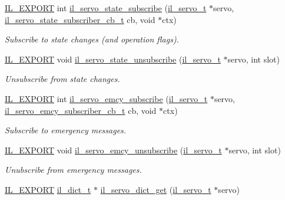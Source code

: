 \begin{DoxyCompactItemize}
\hyperlink{common_8h_a6bb629d26c52bfe10519ba3176853f47}{I\+L\+\_\+\+E\+X\+P\+O\+RT} int \hyperlink{group__IL__SERVO_gab48c5b7f3f359ab4ad358525e9f69d88}{il\+\_\+servo\+\_\+state\+\_\+subscribe} (\hyperlink{group__IL__SERVO_ga3369ddfcc33492fe3a28f96cf455b13e}{il\+\_\+servo\+\_\+t} $\ast$servo, \hyperlink{group__IL__SERVO_ga60c0557ef5bc4c9e1b3bd32ea8d82861}{il\+\_\+servo\+\_\+state\+\_\+subscriber\+\_\+cb\+\_\+t} cb, void $\ast$ctx)
\begin{DoxyCompactList}\small\item\em Subscribe to state changes (and operation flags). \end{DoxyCompactList}\item 
\hyperlink{common_8h_a6bb629d26c52bfe10519ba3176853f47}{I\+L\+\_\+\+E\+X\+P\+O\+RT} void \hyperlink{group__IL__SERVO_gab9badbee2d7c812fd70f36e54b33f102}{il\+\_\+servo\+\_\+state\+\_\+unsubscribe} (\hyperlink{group__IL__SERVO_ga3369ddfcc33492fe3a28f96cf455b13e}{il\+\_\+servo\+\_\+t} $\ast$servo, int slot)
\begin{DoxyCompactList}\small\item\em Unsubscribe from state changes. \end{DoxyCompactList}\item 
\hyperlink{common_8h_a6bb629d26c52bfe10519ba3176853f47}{I\+L\+\_\+\+E\+X\+P\+O\+RT} int \hyperlink{group__IL__SERVO_gad64153fedf0e2c82b88b545de2a1e134}{il\+\_\+servo\+\_\+emcy\+\_\+subscribe} (\hyperlink{group__IL__SERVO_ga3369ddfcc33492fe3a28f96cf455b13e}{il\+\_\+servo\+\_\+t} $\ast$servo, \hyperlink{group__IL__SERVO_gad86cbd352b4ca4f73aa5bddece082a11}{il\+\_\+servo\+\_\+emcy\+\_\+subscriber\+\_\+cb\+\_\+t} cb, void $\ast$ctx)
\begin{DoxyCompactList}\small\item\em Subscribe to emergency messages. \end{DoxyCompactList}\item 
\hyperlink{common_8h_a6bb629d26c52bfe10519ba3176853f47}{I\+L\+\_\+\+E\+X\+P\+O\+RT} void \hyperlink{group__IL__SERVO_ga2bfe5b7de979ba3a7339292afa7c0a3b}{il\+\_\+servo\+\_\+emcy\+\_\+unsubscribe} (\hyperlink{group__IL__SERVO_ga3369ddfcc33492fe3a28f96cf455b13e}{il\+\_\+servo\+\_\+t} $\ast$servo, int slot)
\begin{DoxyCompactList}\small\item\em Unubscribe from emergency messages. \end{DoxyCompactList}\item 
\hyperlink{common_8h_a6bb629d26c52bfe10519ba3176853f47}{I\+L\+\_\+\+E\+X\+P\+O\+RT} \hyperlink{group__IL__DICT_gac2cb8ba7974d8506df3017879572fc84}{il\+\_\+dict\+\_\+t} $\ast$ \hyperlink{group__IL__SERVO_ga396350b82f3aeef0950533871c2d1214}{il\+\_\+servo\+\_\+dict\+\_\+get} (\hyperlink{group__IL__SERVO_ga3369ddfcc33492fe3a28f96cf455b13e}{il\+\_\+servo\+\_\+t} $\ast$servo)

\end{DoxyCompactItemize}
